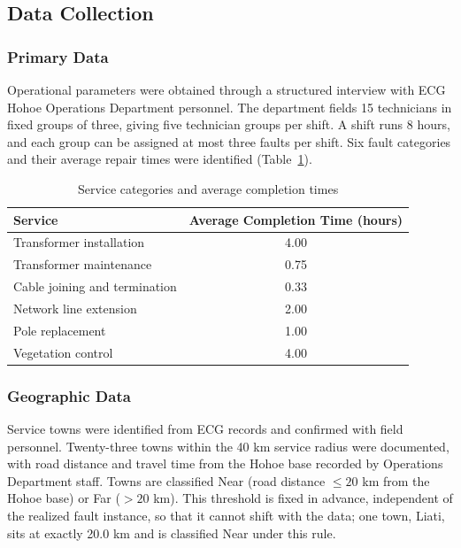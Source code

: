 \documentclass[11pt]{article}
\begin{document}
\subsection*{Data Collection}
\subsubsection*{Primary Data}
Operational parameters were obtained through a structured interview with ECG Hohoe Operations Department personnel. The department fields 15 technicians in fixed groups of three, giving five technician groups per shift. A shift runs 8 hours, and each group can be assigned at most three faults per shift. Six fault categories and their average repair times were identified (Table~\ref{tab:services}).

\begin{table}[H]
\centering
\caption{Service categories and average completion times}
\label{tab:services}
\begin{tabular}{l c}
\toprule
Service & Average Completion Time (hours) \\
\midrule
Transformer installation & 4.00 \\
Transformer maintenance & 0.75 \\
Cable joining and termination & 0.33 \\
Network line extension & 2.00 \\
Pole replacement & 1.00 \\
Vegetation control & 4.00 \\
\bottomrule
\end{tabular}
\end{table}

\subsubsection*{Geographic Data}

Service towns were identified from ECG records and confirmed with field personnel. Twenty-three towns within the 40 km service radius were documented, with road distance and travel time from the Hohoe base recorded by Operations Department staff. Towns are classified Near (road distance $\leq 20$ km from the Hohoe base) or Far ($> 20$ km). This threshold is fixed in advance, independent of the realized fault instance, so that it cannot shift with the data; one town, Liati, sits at exactly 20.0 km and is classified Near under this rule.
\end{document}
